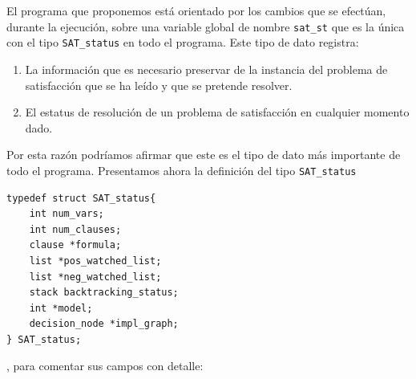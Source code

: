 \documentclass[12pt,lettersize,oneside]{article}
\begin{document}
El programa que proponemos está orientado por los cambios que se efectúan,
durante la ejecución, sobre una variable global de nombre {\tt sat\_st} que es la
única con el tipo {\tt SAT\_status} en todo el programa. 
Este tipo de dato registra: \vspace{-4.5mm}
\begin{enumerate}
\item La información que es necesario preservar de la instancia del problema de
  satisfacción que se ha leído y que se pretende resolver.
\item El estatus de resolución de un problema de satisfacción en cualquier
  momento dado.
\end{enumerate}
Por esta razón podríamos afirmar que este es el tipo de dato más importante de
todo el programa.
Presentamos ahora la definición del tipo {\tt SAT\_status}
\begin{lstlisting}
typedef struct SAT_status{    
    int num_vars;
    int num_clauses;
    clause *formula;
    list *pos_watched_list;
    list *neg_watched_list;
    stack backtracking_status;
    int *model;
    decision_node *impl_graph;                     
} SAT_status;
\end{lstlisting}
, para comentar sus campos con detalle:\vspace{-2.5mm}
\end{document}
